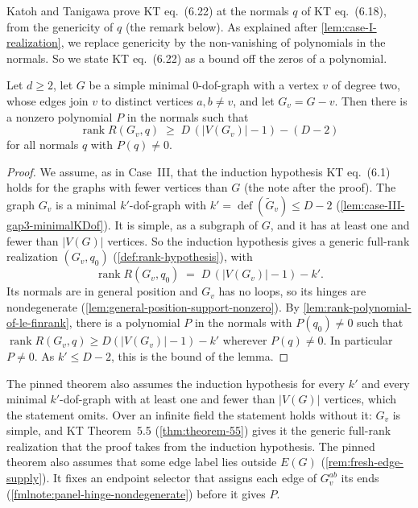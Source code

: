 Katoh and Tanigawa prove KT eq.~(6.22) at the normals $q$ of KT
eq.~(6.18), from the genericity of $q$ (the remark below). As
explained after \cref{lem:case-I-realization}, we replace genericity by
the non-vanishing of polynomials in the normals. So we state KT
eq.~(6.22) as a bound off the zeros of a polynomial.

\begin{lemma}
  \label{lem:case-III-nested-rank-lower}
  \leanok
  Let $d \ge 2$, let $G$ be a simple minimal $0$-dof-graph with a vertex
  $v$ of degree two, whose edges join $v$ to distinct vertices
  $a, b \neq v$, and let $G_v = G - v$. Then there is a nonzero polynomial $P$ in the
  normals such that
  \[
    \operatorname{rank} R(G_v, q) \;\ge\; D\,(|V(G_v)| - 1) - (D - 2)
  \]
  for all normals $q$ with $P(q) \neq 0$.
\end{lemma}
\begin{proof}
  \leanok
  We assume, as in Case~III, that the induction hypothesis KT
  eq.~(6.1) holds for the graphs with fewer vertices than $G$ (the note
  after the proof). The graph $G_v$ is a minimal $k'$-dof-graph with
  $k' = \operatorname{def}(\tilde G_v) \le D - 2$
  (\cref{lem:case-III-gap3-minimalKDof}).
  It is simple, as a subgraph of $G$, and it has at least one and fewer
  than $|V(G)|$ vertices. So the induction hypothesis gives a generic
  full-rank realization $(G_v, q_0)$ (\cref{def:rank-hypothesis}), with
  \[
    \operatorname{rank} R(G_v, q_0) \;=\; D\,(|V(G_v)| - 1) - k'.
  \]
  Its normals are in general position and $G_v$ has no loops, so its
  hinges are nondegenerate (\cref{lem:general-position-support-nonzero}).
  By \cref{lem:rank-polynomial-of-le-finrank}, there is a polynomial $P$
  in the normals with $P(q_0) \neq 0$ such that
  $\operatorname{rank} R(G_v, q) \ge D(|V(G_v)| - 1) - k'$ wherever
  $P(q) \neq 0$. In particular $P \neq 0$. As $k' \le D - 2$, this is
  the bound of the lemma.
\end{proof}

\begin{fmlnote}
  The pinned theorem also assumes the induction hypothesis for every
  $k'$ and every minimal $k'$-dof-graph with at least one and fewer than
  $|V(G)|$ vertices, which the statement omits. Over an infinite field
  the statement holds without it: $G_v$ is simple, and KT Theorem~5.5
  (\cref{thm:theorem-55}) gives it the generic full-rank realization
  that the proof takes from the induction hypothesis. The pinned
  theorem also assumes that some edge label lies outside
  $E(G)$ (\cref{rem:fresh-edge-supply}). It fixes an endpoint selector
  that assigns each edge of $G_v^{ab}$ its ends
  (\cref{fmlnote:panel-hinge-nondegenerate}) before it gives $P$.
\end{fmlnote}

